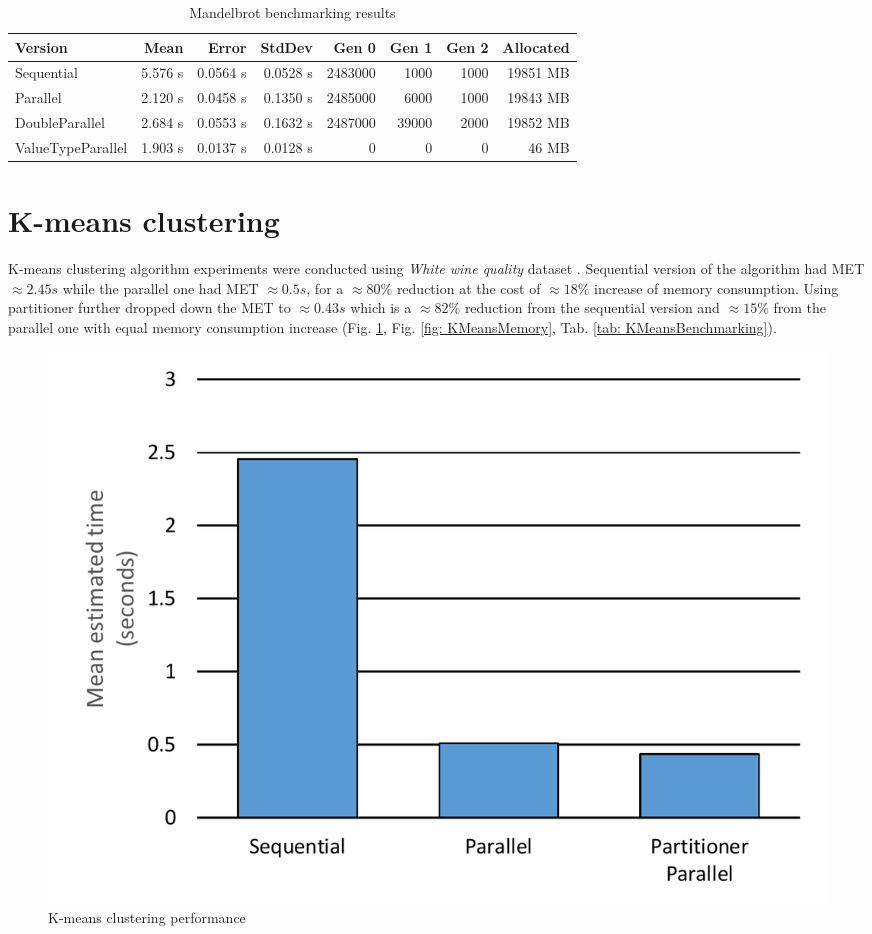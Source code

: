 \begin{table}[ht]%
    \centering
    \caption{Mandelbrot benchmarking results}
		\label{tab: MandelbrotBenchmarking}
    \begin{tabularx}{\linewidth}{Xrrrrrrr} \toprule
			\bfseries Version 	&
			\bfseries Mean    	&
			\bfseries Error	    &
			\bfseries StdDev	  &
			\bfseries Gen 0	    &
			\bfseries Gen 1	    &
			\bfseries Gen 2	    &
			\bfseries Allocated \\ \midrule
			Sequential & 5.576 s & 0.0564 s & 0.0528 s & 2483000 & 1000 & 1000 & 
19851 MB \\ 
			Parallel & 2.120 s & 0.0458 s & 0.1350 s & 2485000 & 6000 & 1000 & 19843
 MB \\ 
			DoubleParallel & 2.684 s & 0.0553 s & 0.1632 s & 2487000 & 39000 & 2000 
& 19852 MB \\ 
			ValueTypeParallel & 1.903 s & 0.0137 s & 0.0128 s & 0 & 0 & 0 & 46 MB \\ 
			\bottomrule
	\end{tabularx}
\end{table}

\clearpage
\section{K-means clustering}
K-means clustering algorithm experiments were conducted using \emph{White 
wine quality} dataset \cite{WhiteWine}. Sequential version of the algorithm 
had MET $\approx 2.45s$ while the parallel one had MET $\approx 0.5s$, for a $
\approx 80\%$ reduction at the cost of $\approx 18\%$ increase of memory 
consumption. Using partitioner further dropped down the MET to $\approx 0.43s$
 which is a $\approx 82\%$ reduction from the sequential version and $\approx 
15\%$ from the parallel one with equal memory consumption increase (Fig. \ref{fig: KMeansPerformance}, Fig. \ref{fig: KMeansMemory}, Tab. \ref{tab: 
KMeansBenchmarking}).

\begin{figure}[htb]
\centering
\includegraphics[width=.8\linewidth]{figures04/KMeans.pdf}
\caption{K-means clustering  performance}
\label{fig: KMeansPerformance}
\end{figure}

